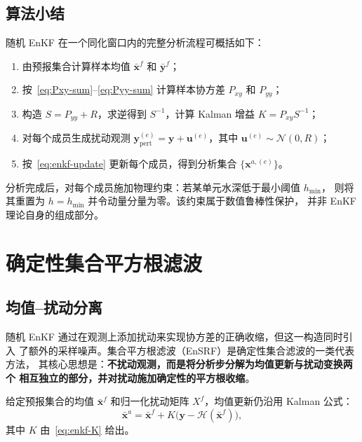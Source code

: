 \documentclass[12pt,a4paper]{article}
\newcommand{\x}{\bm{x}}
\newcommand{\y}{\bm{y}}
\newcommand{\calH}{\mathcal{H}}
\begin{document}
\subsection{算法小结}

随机 EnKF 在一个同化窗口内的完整分析流程可概括如下：

\begin{enumerate}[label=(\arabic*), leftmargin=*]
  \item 由预报集合计算样本均值 $\bar{\x}^f$ 和 $\bar{\y}^f$；
  \item 按~\eqref{eq:Pxy-sum}--\eqref{eq:Pyy-sum} 计算样本协方差 $P_{xy}$ 和 $P_{yy}$；
  \item 构造 $S = P_{yy} + R$，求逆得到 $S^{-1}$，计算 Kalman 增益 $K = P_{xy}S^{-1}$；
  \item 对每个成员生成扰动观测 $\y^{(e)}_{\mathrm{pert}} = \y + \bm{u}^{(e)}$，其中
        $\bm{u}^{(e)} \sim \mathcal{N}(0, R)$；
  \item 按~\eqref{eq:enkf-update} 更新每个成员，得到分析集合 $\{\x^{a,(e)}\}$。
\end{enumerate}

分析完成后，对每个成员施加物理约束：若某单元水深低于最小阈值 $h_{\min}$，
则将其重置为 $h = h_{\min}$ 并令动量分量为零。该约束属于数值鲁棒性保护，
并非 EnKF 理论自身的组成部分。

\section{确定性集合平方根滤波}
\label{sec:ensrf}

\subsection{均值--扰动分离}

随机 EnKF 通过在观测上添加扰动来实现协方差的正确收缩，但这一构造同时引入
了额外的采样噪声。集合平方根滤波（EnSRF）是确定性集合滤波的一类代表方法，
其核心思想是：\textbf{不扰动观测，而是将分析步分解为均值更新与扰动变换两个
相互独立的部分，并对扰动施加确定性的平方根收缩}。

给定预报集合的均值 $\bar{\x}^f$ 和归一化扰动矩阵 $X^f$，均值更新仍沿用
Kalman 公式：
\begin{equation}
  \bar{\x}^a = \bar{\x}^f + K\bigl(\y - \calH(\bar{\x}^f)\bigr),
  \label{eq:ensrf-mean}
\end{equation}
其中 $K$ 由~\eqref{eq:enkf-K} 给出。
\end{document}
